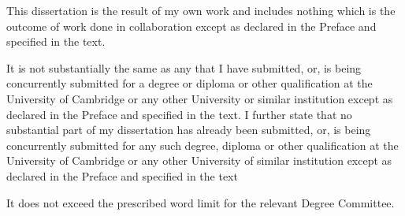 \noindent
This dissertation is the result of my own work and includes nothing which is the
outcome of work done in collaboration except as declared in the Preface and
specified in the text.

It is not substantially the same as any that I have submitted, or, is being
concurrently submitted for a degree or diploma or other qualification at the
University of Cambridge or any other University or similar institution except as
declared in the Preface and specified in the text. I further state that no
substantial part of my dissertation has already been submitted, or, is being
concurrently submitted for any such degree, diploma or other qualification at
the University of Cambridge or any other University of similar institution
except as declared in the Preface and specified in the text

It does not exceed the prescribed word limit for the relevant Degree Committee.

